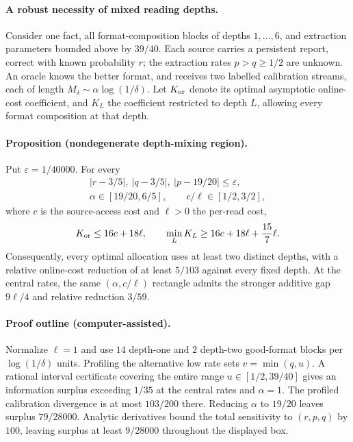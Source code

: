 \paragraph{A robust necessity of mixed reading depths.}
Consider one fact, all format-composition blocks of depths $1,\ldots,6$,
and extraction parameters bounded above by $39/40$.
Each source carries a persistent report, correct with known probability $r$;
the extraction rates $p>q\ge1/2$ are unknown.
An oracle knows the better format, and receives two labelled calibration
streams, each of length $M_\delta\sim\alpha\log(1/\delta)$.
Let $K_{\rm or}$ denote its optimal asymptotic online-cost coefficient,
and $K_L$ the coefficient restricted to depth $L$, allowing every format
composition at that depth.

\paragraph{Proposition (nondegenerate depth-mixing region).}
Put $\varepsilon=1/40000$. For every
\[
\begin{gathered}
|r-3/5|,\ |q-3/5|,\ |p-19/20|\le\varepsilon,\\
\alpha\in[19/20,6/5],\qquad c/\ell\in[1/2,3/2],
\end{gathered}
\]
where $c$ is the source-access cost and $\ell>0$ the per-read cost,
\[
K_{\rm or}\le16c+18\ell,\qquad
\min_L K_L\ge16c+18\ell+\frac{15}{7}\ell.
\]
Consequently, every optimal allocation uses at least two distinct depths,
with a relative online-cost reduction of at least $5/103$ against every
fixed depth. At the central rates, the same $(\alpha,c/\ell)$ rectangle
admits the stronger additive gap $9\ell/4$ and relative reduction $3/59$.

\paragraph{Proof outline (computer-assisted).}
Normalize $\ell=1$ and use $14$ depth-one and $2$ depth-two good-format
blocks per $\log(1/\delta)$ units. Profiling the alternative low rate
sets $v=\min(q,u)$. A rational interval certificate covering the entire
range $u\in[1/2,39/40]$ gives an information surplus exceeding $1/35$
at the central rates and $\alpha=1$.
The profiled calibration divergence is at most $103/200$ there.
Reducing $\alpha$ to $19/20$ leaves surplus $79/28000$.
Analytic derivatives bound the total sensitivity to $(r,p,q)$ by $100$,
leaving surplus at least $9/28000$ throughout the displayed box.


